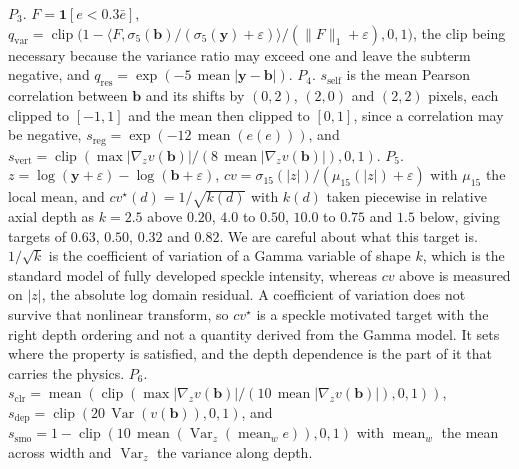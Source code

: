 {$P_3$.
$F=\mathbf{1}[e<0.3\bar e]$,
$q_{\text{var}}=\operatorname{clip}\big(1-\langle F,\sigma_5(\mathbf{b})/(\sigma_5(\mathbf{y})+\varepsilon)\rangle/(\|F\|_1+\varepsilon),0,1\big)$,
the clip being necessary because the variance ratio may exceed one and leave the subterm negative,
and $q_{\text{res}}=\exp(-5\,\operatorname{mean}|\mathbf{y}-\mathbf{b}|)$.
$P_4$.
$s_{\text{self}}$ is the mean Pearson correlation between $\mathbf{b}$ and its shifts by $(0,2)$,
$(2,0)$ and $(2,2)$ pixels, each clipped to $[-1,1]$ and the mean then clipped to $[0,1]$, since a
correlation may be negative,
$s_{\text{reg}}=\exp(-12\,\operatorname{mean}(e(e)))$,
and $s_{\text{vert}}=\operatorname{clip}(\max |\nabla_z v(\mathbf{b})|/(8\,\operatorname{mean}|\nabla_z v(\mathbf{b})|),0,1)$.
$P_5$.
$z=\log(\mathbf{y}+\varepsilon)-\log(\mathbf{b}+\varepsilon)$,
$cv=\sigma_{15}(|z|)/(\mu_{15}(|z|)+\varepsilon)$ with $\mu_{15}$ the local mean,
and $cv^\star(d) = 1/\sqrt{k(d)}$ with $k(d)$ taken piecewise in relative axial depth as $k = 2.5$
above $0.20$, $4.0$ to $0.50$, $10.0$ to $0.75$ and $1.5$ below, giving targets of $0.63$, $0.50$,
$0.32$ and $0.82$. We are careful about what this target is. $1/\sqrt{k}$ is the coefficient of
variation of a Gamma variable of shape $k$, which is the standard model of fully developed speckle
intensity, whereas $cv$ above is measured on $|z|$, the absolute log domain residual. A coefficient of
variation does not survive that nonlinear transform, so $cv^\star$ is a speckle motivated target with
the right depth ordering and not a quantity derived from the Gamma model. It sets where the property
is satisfied, and the depth dependence is the part of it that carries the physics.
$P_6$.
$s_{\text{clr}}=\operatorname{mean}(\operatorname{clip}(\max |\nabla_z v(\mathbf{b})|/(10\,\operatorname{mean}|\nabla_z v(\mathbf{b})|),0,1))$,
$s_{\text{dep}}=\operatorname{clip}(20\,\operatorname{Var}(v(\mathbf{b})),0,1)$,
and $s_{\text{smo}}=1-\operatorname{clip}(10\,\operatorname{mean}(\operatorname{Var}_z(\operatorname{mean}_w e)),0,1)$
with $\operatorname{mean}_w$ the mean across width and $\operatorname{Var}_z$ the variance along depth.
}
